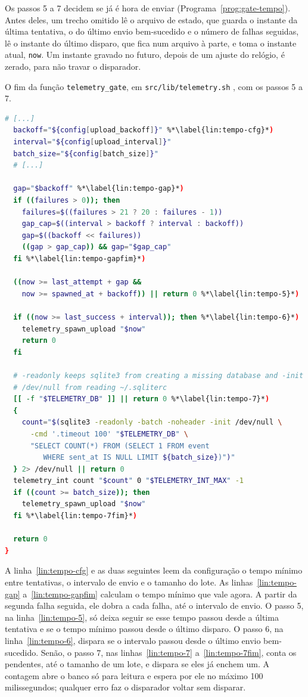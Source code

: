 Os passos 5 a 7 decidem se já é hora de enviar
(Programa~\ref{prog:gate-tempo}). Antes deles, um trecho omitido lê o arquivo
de estado, que guarda o instante da última tentativa, o do último envio
bem-sucedido e o número de falhas seguidas, lê o instante do último disparo,
que fica num arquivo à parte, e toma o instante atual, \texttt{now}. Um instante gravado no futuro, depois de um
ajuste do relógio, é zerado, para não travar o disparador.

\begin{programruledcaption}{O fim da função \texttt{telemetry\_gate}, em
    \texttt{src/\allowbreak{}lib/\allowbreak{}telemetry.sh} \citep{kwfork_telemetry},
    com os passos 5 a 7.
    \label{prog:gate-tempo}}
\begin{lstlisting}[language=bash, style=wider]
  # [...]
  backoff="${config[upload_backoff]}" %*\label{lin:tempo-cfg}*)
  interval="${config[upload_interval]}"
  batch_size="${config[batch_size]}"
  # [...]

  gap="$backoff" %*\label{lin:tempo-gap}*)
  if ((failures > 0)); then
    failures=$((failures > 21 ? 20 : failures - 1))
    gap_cap=$((interval > backoff ? interval : backoff))
    gap=$((backoff << failures))
    ((gap > gap_cap)) && gap="$gap_cap"
  fi %*\label{lin:tempo-gapfim}*)

  ((now >= last_attempt + gap &&
    now >= spawned_at + backoff)) || return 0 %*\label{lin:tempo-5}*)

  if ((now >= last_success + interval)); then %*\label{lin:tempo-6}*)
    telemetry_spawn_upload "$now"
    return 0
  fi

  # -readonly keeps sqlite3 from creating a missing database and -init
  # /dev/null from reading ~/.sqliterc
  [[ -f "$TELEMETRY_DB" ]] || return 0 %*\label{lin:tempo-7}*)
  {
    count="$(sqlite3 -readonly -batch -noheader -init /dev/null \
      -cmd '.timeout 100' "$TELEMETRY_DB" \
      "SELECT COUNT(*) FROM (SELECT 1 FROM event
         WHERE sent_at IS NULL LIMIT ${batch_size})")"
  } 2> /dev/null || return 0
  telemetry_int count "$count" 0 "$TELEMETRY_INT_MAX" -1
  if ((count >= batch_size)); then
    telemetry_spawn_upload "$now"
  fi %*\label{lin:tempo-7fim}*)

  return 0
}
\end{lstlisting}
\end{programruledcaption}

A linha~\ref{lin:tempo-cfg} e as duas seguintes leem da configuração o tempo
mínimo entre tentativas, o intervalo de envio e o tamanho do lote. As linhas~\ref{lin:tempo-gap}
a~\ref{lin:tempo-gapfim} calculam o tempo mínimo que vale agora. A partir da
segunda falha seguida, ele dobra a cada falha, até o intervalo de envio. O
passo 5, na linha~\ref{lin:tempo-5}, só deixa seguir se esse tempo passou desde
a última tentativa e se o tempo mínimo passou desde o último disparo. O passo
6, na linha~\ref{lin:tempo-6}, dispara se o intervalo passou desde o último
envio bem-sucedido. Senão, o passo 7, nas linhas~\ref{lin:tempo-7}
a~\ref{lin:tempo-7fim}, conta os pendentes, até o tamanho de um lote, e
dispara se eles já enchem um. A contagem abre o banco só para leitura e espera
por ele no máximo 100 milissegundos; qualquer erro faz o disparador voltar sem
disparar.

